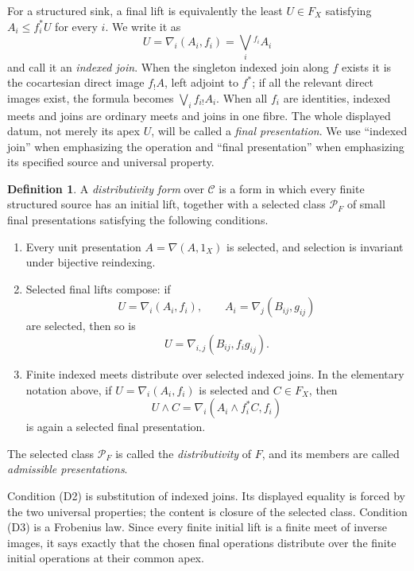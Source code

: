 \documentclass[12pt,oneside,reqno]{amsart}
\theoremstyle{definition}
\newtheorem{definition}[theorem]{Definition}
\theoremstyle{remark}
\newcommand{\C}{\mathcal C}
\begin{document}
For a structured sink, a final lift is equivalently the
least \(U\in F_X\) satisfying \(A_i\leqslant f_i^*U\) for every
\(i\).  We write it as
\[
             U=\nabla_i(A_i,f_i)
               =\bigvee_i{}^{f_i} A_i
\]
and call it an \emph{indexed join}.  When the singleton indexed join
along \(f\) exists it is the cocartesian direct image \(f_!A\), left
adjoint to \(f^*\); if all the relevant direct images exist, the formula
becomes \(\bigvee_i f_{i!}A_i\).  When all \(f_i\) are identities,
indexed meets and joins are ordinary meets and joins in one fibre.  The
whole displayed datum, not merely its apex \(U\), will be called a
\emph{final presentation}.  We use ``indexed join'' when emphasizing
the operation and ``final presentation'' when emphasizing its specified
source and universal property.

\begin{definition}\label{def:distributivity-form}
A \emph{distributivity form} over \(\C\) is a form in which every
finite structured source has an initial lift, together with a selected
class \(\mathcal P_F\) of small final presentations satisfying the
following conditions.
\begin{enumerate}[label=\textup{(D\arabic*)}]
\item Every unit presentation
\(A=\nabla(A,1_X)\) is selected, and selection is invariant under
bijective reindexing.
\item Selected final lifts compose: if
\[
 U=\nabla_i(A_i,f_i),
 \qquad
 A_i=\nabla_j(B_{ij},g_{ij})
\]
are selected, then so is
\[
                 U=\nabla_{i,j}(B_{ij},f_i g_{ij}).
\]
\item Finite indexed meets distribute over selected indexed joins.  In
the elementary notation above, if
\(U=\nabla_i(A_i,f_i)\) is selected and \(C\in F_X\), then
\[
 U\wedge C
   =\nabla_i(A_i\wedge f_i^*C,f_i)
\]
is again a selected final presentation.
\end{enumerate}
The selected class \(\mathcal P_F\) is called the
\emph{distributivity} of \(F\), and its members are called
\emph{admissible presentations}.
\end{definition}

Condition (D2) is substitution of indexed joins.  Its displayed equality
is forced by the two universal properties; the content is closure of
the selected class.  Condition (D3) is a Frobenius law.  Since every
finite initial lift is a finite meet of inverse images, it says exactly
that the chosen final operations distribute over the finite initial
operations at their common apex.
\end{document}
